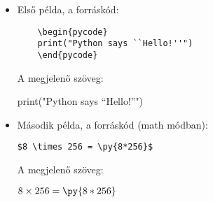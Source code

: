 \documentclass{article}
\begin{document}
\begin{itemize}
\item Első példa, a forráskód:
\begin{verbatim}
	\begin{pycode}
	print("Python says ``Hello!''")
	\end{pycode}
\end{verbatim}
A megjelenő szöveg:

\begin{pycode}
print("Python says ``Hello!''")
\end{pycode}

\item Második példa, a forráskód (math módban):

\verb!$8 \times 256 = \py{8*256}$!

A megjelenő szöveg:

$8 \times 256 = \py{8*256}$
\end{itemize}
\end{document}
